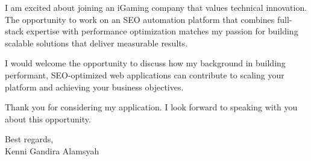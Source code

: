 \documentclass[12pt]{article}
\begin{document}
\begin{flushleft}
I am excited about joining an iGaming company that values technical innovation. The opportunity to work on an SEO automation platform that combines full-stack expertise with performance optimization matches my passion for building scalable solutions that deliver measurable results.

I would welcome the opportunity to discuss how my background in building performant, SEO-optimized web applications can contribute to scaling your platform and achieving your business objectives.

Thank you for considering my application. I look forward to speaking with you about this opportunity.

\vspace{0.5cm}

Best regards, \\
Kenni Gandira Alamsyah

\end{flushleft}
\end{document}
